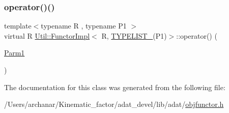 \mbox{\label{classUtil_1_1FunctorImpl_3_01R_00_01TYPELIST__1_07P1_08_4_a62c984afa0dca11e0101cfcba2052a8c}} 
\subsubsection{\texorpdfstring{operator()()}{operator()()}\hspace{0.1cm}{\footnotesize\ttfamily [2/2]}}
{\footnotesize\ttfamily template$<$typename R , typename P1 $>$ \\
virtual R \mbox{\hyperlink{classUtil_1_1FunctorImpl}{Util\+::\+Functor\+Impl}}$<$ R, \mbox{\hyperlink{install_2include_2adat_2typelist_8h_a6a7a6aa3dece450c8d239713e2952df7}{T\+Y\+P\+E\+L\+I\+S\+T\+\_}}(P1)$>$\+::operator() (\begin{DoxyParamCaption}\item[{\mbox{\hyperlink{structUtil_1_1Private_1_1FunctorImplBase_a9d61e693d6c616dea5bd9d9073c7d21a}{Parm1}}}]{ }\end{DoxyParamCaption})\hspace{0.3cm}{\ttfamily [pure virtual]}}



The documentation for this class was generated from the following file\+:\begin{DoxyCompactItemize}
\item 
/\+Users/archanar/\+Kinematic\+\_\+factor/adat\+\_\+devel/lib/adat/\mbox{\hyperlink{lib_2adat_2objfunctor_8h}{objfunctor.\+h}}\end{DoxyCompactItemize}
